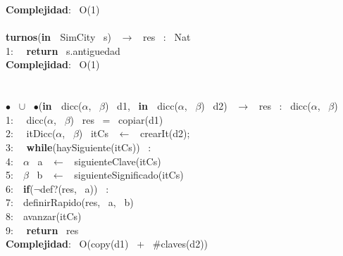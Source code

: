 \begin{Algoritmos}
    \textbf{Complejidad}: \ O(1)\\
    \makebox[\linewidth]{\rule{\textwidth}{0.4pt}}
    \\
    \makebox[\linewidth]{\rule{\textwidth}{0.4pt}}
    \textbf{turnos}(\textbf{in \ }SimCity \ s) \ $\rightarrow $ \ res \ : \ Nat\\
    1: \  \ \textbf{return} \ s.antiguedad\\
    \textbf{Complejidad}: \ O(1)\\
    \makebox[\linewidth]{\rule{\textwidth}{0.4pt}}
    \\
    \pagebreak \\
    \makebox[\linewidth]{\rule{\textwidth}{0.4pt}}
    $\bullet$ \ $\cup$ \ $\bullet$(\textbf{in \ }dicc($\alpha$, \ $\beta$) \ d1, \ \textbf{in \ }dicc($\alpha$, \ $\beta$) \ d2) \ $\rightarrow $ \ res \ : \ dicc($\alpha$, \ $\beta$)\\
    1: \  \ dicc($\alpha$, \ $\beta$) \ res \ = \ copiar(d1)\\
    2: \  \ itDicc($\alpha$, \ $\beta$) \ itCs \ $\leftarrow$ \ crearIt(d2);\\
    3: \  \ \textbf{while}(haySiguiente(itCs)) \ :\\
    4:\indent  \  \ $\alpha$ \ a \ $\leftarrow$ \ siguienteClave(itCs)\\
    5:\indent  \  \ $\beta$ \ b \ $\leftarrow$ \ siguienteSignificado(itCs)\\
    6:\indent  \  \ \textbf{if}($\neg$def?(res, \ a)) \ :\\
    7:\indent \indent  \  \ definirRapido(res, \ a, \ b)\\
    8:\indent  \  \ avanzar(itCs)\\
    9: \  \ \textbf{return} \ res\\
    \textbf{Complejidad}: \ O(copy(d1) \ + \ $ \# $claves(d2))\\
    \makebox[\linewidth]{\rule{\textwidth}{0.4pt}}
    
\end{Algoritmos}

